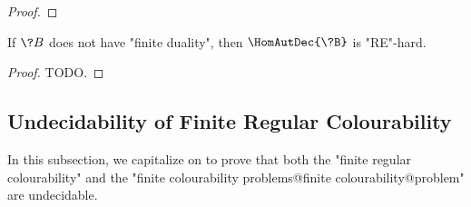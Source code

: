 \begin{proof}
\end{proof}


\begin{corollary}
	\AP\label{coro:lowerbound-homreg}
	If $\?B$ does not have "finite duality", then $\HomAutDec{\?B}$
	is "RE"-hard.
\end{corollary}

\begin{proof}
	TODO.
\end{proof}


\subsection{\AP\label{sec:undecidability-finite-colourability}Undecidability of Finite Regular Colourability}

In this subsection, we capitalize on  to 
prove that both the "finite regular colourability" and the "finite colourability problems@finite colourability@problem" are undecidable.

